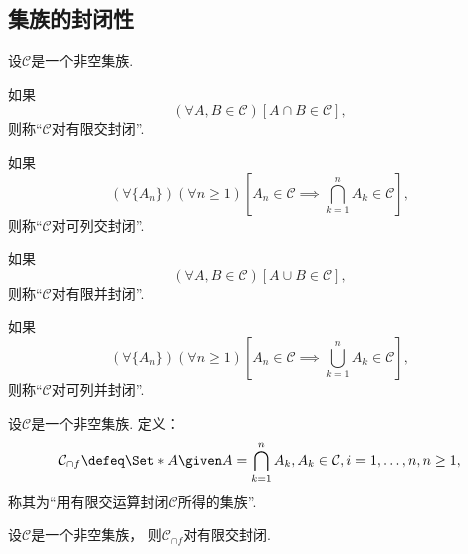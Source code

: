 \subsection{集族的封闭性}
\begin{definition}[集族的封闭性]
设\(\mathcal{C}\)是一个非空集族.

如果\[
	(\forall A,B\in\mathcal{C})
	[A \cap B \in \mathcal{C}],
\]
则称“\(\mathcal{C}\)对有限交封闭”.

如果\[
	(\forall \{A_n\})
	(\forall n\geq1)
	\left[A_n\in\mathcal{C} \implies \bigcap_{k=1}^n A_k \in \mathcal{C}\right],
\]
则称“\(\mathcal{C}\)对可列交封闭”.

如果\[
	(\forall A,B\in\mathcal{C})
	[A \cup B \in \mathcal{C}],
\]
则称“\(\mathcal{C}\)对有限并封闭”.

如果\[
	(\forall \{A_n\})
	(\forall n\geq1)
	\left[A_n\in\mathcal{C} \implies \bigcup_{k=1}^n A_k \in \mathcal{C}\right],
\]
则称“\(\mathcal{C}\)对可列并封闭”.
\end{definition}

\begin{definition}
设\(\mathcal{C}\)是一个非空集族.
定义：\[
	\mathcal{C}_{\cap f}
	\defeq
	\Set*{
		A \given
		A = \bigcap_{k=1}^n A_k,
		A_k \in \mathcal{C}, i=1,\dotsc,n,
		n\geq1
	},
\]
称其为“用有限交运算封闭\(\mathcal{C}\)所得的集族”.
\end{definition}

\begin{proposition}
设\(\mathcal{C}\)是一个非空集族，
则\(\mathcal{C}_{\cap f}\)对有限交封闭.
\end{proposition}
